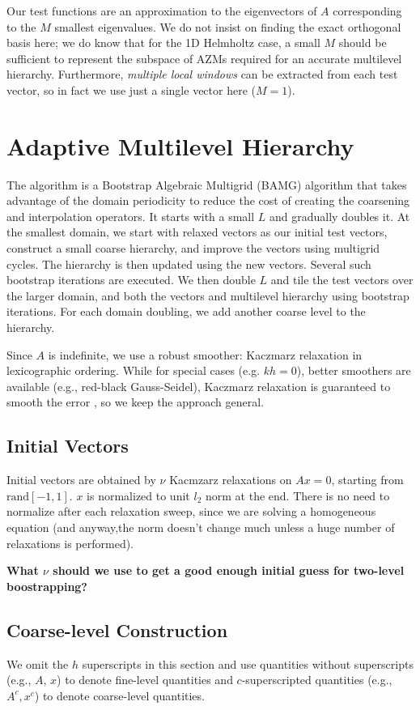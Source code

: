 \documentclass{article}
\begin{document}
Our test functions are an approximation to the eigenvectors of $A$ corresponding to the $M$ smallest eigenvalues. We do not insist on finding the exact orthogonal basis here; we do know that for the 1D Helmholtz case, a small $M$ should be sufficient to represent the subspace of AZMs required for an accurate multilevel hierarchy. Furthermore,  \emph{multiple local windows} can be extracted from each test vector, so in fact we use just a single vector here ($M = 1$).

\section{Adaptive Multilevel Hierarchy}
The algorithm is a Bootstrap Algebraic Multigrid (BAMG) \cite{bamg} algorithm that takes advantage of the domain periodicity to reduce the cost of creating the coarsening and interpolation operators. It starts with a small $L$ and gradually doubles it. At the smallest domain, we start with relaxed vectors as our initial test vectors, construct a small coarse hierarchy, and improve the vectors using multigrid cycles. The hierarchy is then updated using the new vectors. Several such bootstrap iterations are executed. We then double $L$ and tile the test vectors over the larger domain, and both the vectors and multilevel hierarchy using bootstrap iterations. For each domain doubling, we add another coarse level to the hierarchy.

Since $A$ is indefinite, we use a robust smoother: Kaczmarz relaxation in lexicographic ordering. While for special cases (e.g. $k h = 0$), better smoothers are available (e.g., red-black Gauss-Seidel), Kaczmarz relaxation is guaranteed to smooth the error \cite{amg_theory}, so we keep the approach general.

\subsection{Initial Vectors}
Initial vectors are obtained by $\nu$ Kacmzarz relaxations on $A x = 0$, starting from $\text{rand}[-1, 1]$. $x$ is normalized to unit $l_2$ norm at the end. There is no need to normalize after each relaxation sweep, since we are solving a homogeneous equation (and anyway,the norm doesn't change much unless a huge number of relaxations is performed). 

{\bf What $\nu$ should we use to get a good enough initial guess for two-level boostrapping?}

\subsection{Coarse-level Construction}
We omit the $h$ superscripts in this section and use quantities without superscripts (e.g., $A$, $x$) to denote fine-level quantities and $c$-superscripted quantities (e.g., $A^c, x^c$) to denote coarse-level quantities.
\end{document}

